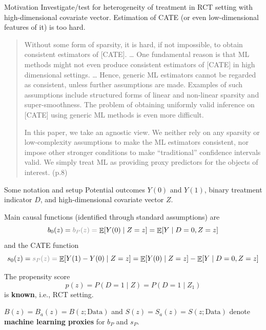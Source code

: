 \documentclass[smaller, aspectratio=169]{beamer}
\newcommand{\E}{{\ensuremath{\mathop{{\mathbb{E}}}}}}
\newcommand{\1}{\mathds{1}}
\begin{document}
\begin{frame}[label={sec:org7d4cc0e}]{Motivation}
Investigate/test for heterogeneity of treatment in RCT setting with
high-dimensional covariate vector. Estimation of CATE (or even
low-dimensional features of it) is too hard.

\vfill

\begin{quotation} %
Without some form of sparsity, it is hard, if not impossible, to
obtain consistent estimators of [CATE]. \ldots{} One fundamental reason is
that ML methods might not even produce consistent estimators of [CATE]
in high dimensional settings. \ldots{} Hence, generic ML estimators cannot
be regarded as consistent, unless further assumptions are
made. Examples of such assumptions include structured forms of linear
and non-linear sparsity and super-smoothness. The problem of obtaining
uniformly valid inference on [CATE] using generic ML methods is even
more difficult.

In this paper, we take an agnostic view. We neither rely on any
sparsity or low-complexity assumptions to make the ML estimators
consistent, nor impose other stronger conditions to make ``traditional''
confidence intervals valid. We simply treat ML as providing proxy
predictors for the objects of interest. (p.8)
\end{quotation}
\end{frame}


\begin{frame}[label={sec:org52bfb86}]{Some notation and setup}
Potential outcomes \( Y(0) \) and \( Y(1) \), binary treatment
indicator \( D \), and high-dimensional covariate vector \( Z \).

\vfill

Main causal functions (identified through standard assumptions) are
\begin{equation*}
  b_0(z)
  =
  {\color{gray}b_P(z)= \;} 
  \E{\left[ Y(0) \mid Z = z \right]}
  = \E{\left[ Y \mid D=0, Z = z \right]}
\end{equation*}
and the CATE function
\begin{equation*}
  s_0(z)
  =
  {\color{gray}s_P(z) = \;} 
  \E{\left[ Y(1) - Y(0)\mid Z = z \right]}
  = \E{\left[ Y(0) \mid Z = z \right]} - \E{\left[ Y \mid D=0, Z = z \right]}
\end{equation*}

\vfill

The propensity score
\begin{equation*}
  p(z) = P(D=1 \mid Z) = P(D=1 \mid Z_1)
\end{equation*}
is \textbf{known}, i.e., RCT setting. 


\vfill

\( B(z) = B_a(z) = B(z; \text{Data}) \) and
\( S(z) = S_a(z) = S(z; \text{Data}) \) denote \textbf{machine
  learning proxies} for \( b_P \) and \( s_P \).
\end{frame}
\end{document}
